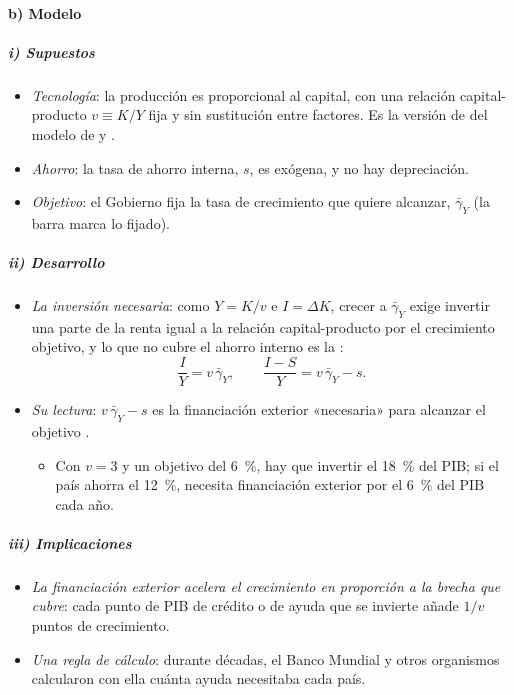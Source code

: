 \documentclass[11pt]{article}
\begin{document}
\paragraph{b) Modelo}

\subparagraph{i) Supuestos}

\begin{itemize}
\item \emph{Tecnología}: la producción es proporcional al capital, con una relación capital-producto $v\equiv K/Y$ fija y sin sustitución entre factores. Es la versión de  del modelo de  y  .
\item \emph{Ahorro}: la tasa de ahorro interna, $s$, es exógena, y no hay depreciación.
\item \emph{Objetivo}: el Gobierno fija la tasa de crecimiento que quiere alcanzar, $\bar\gamma_Y$ (la barra marca lo fijado).
\end{itemize}

\subparagraph{ii) Desarrollo}

\begin{itemize}
\item \emph{La inversión necesaria}: como $Y=K/v$ e $I=\Delta K$, crecer a $\bar\gamma_Y$ exige invertir una parte de la renta igual a la relación capital-producto por el crecimiento objetivo, y lo que no cubre el ahorro interno es la :
  \begin{equation}\label{eq:brecha-ahorro}
  \frac{I}{Y}=v\,\bar\gamma_Y ,\qquad \frac{I-S}{Y}=v\,\bar\gamma_Y-s .
  \end{equation}
\item \emph{Su lectura}: $v\,\bar\gamma_Y-s$ es la financiación exterior «necesaria» para alcanzar el objetivo .
  \begin{itemize}
  \item Con $v=3$ y un objetivo del 6~\%, hay que invertir el 18~\% del PIB; si el país ahorra el 12~\%, necesita financiación exterior por el 6~\% del PIB cada año.
  \end{itemize}
\end{itemize}

\subparagraph{iii) Implicaciones}

\begin{itemize}
\item \emph{La financiación exterior acelera el crecimiento en proporción a la brecha que cubre}: cada punto de PIB de crédito o de ayuda que se invierte añade $1/v$ puntos de crecimiento.
\item \emph{Una regla de cálculo}: durante décadas, el Banco Mundial y otros organismos calcularon con ella cuánta ayuda necesitaba cada país\nocite{Easterly1999}.
\end{itemize}
\end{document}
